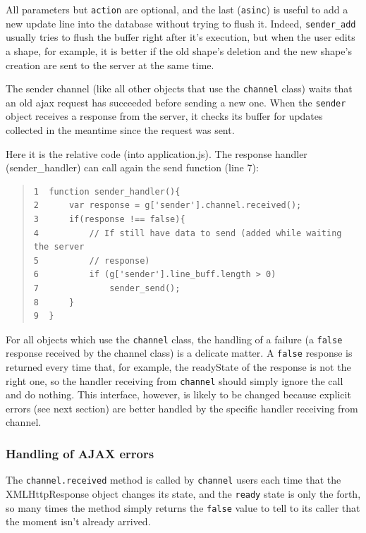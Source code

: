 \documentclass[10pt,a4paper,english]{book}
\begin{document}
All parameters but \texttt{action} are optional, and the last (\texttt{asinc})
is useful to add a new update line into the database without trying to
flush it. Indeed, \texttt{sender{\_}add} usually tries to flush the buffer
right after it's execution, but when the user edits a shape, for
example, it is better if the old shape's deletion and the new shape's
creation are sent to the server at the same time.

The sender channel (like all other objects that use the \texttt{channel}
class) waits that an old ajax request has succeeded before sending a
new one. When the \texttt{sender} object receives a response from the
server, it checks its buffer for updates collected in the meantime
since the request was sent.

Here it is the relative code (into application.js). The response
handler (sender{\_}handler) can call again the send function (line 7):
\begin{quote}\begin{verbatim}
1  function sender_handler(){
2      var response = g['sender'].channel.received();
3      if(response !== false){
4          // If still have data to send (added while waiting the server
5          // response)
6          if (g['sender'].line_buff.length > 0)
7              sender_send();
8      }
9  }
\end{verbatim}
\end{quote}

For all objects which use the \texttt{channel} class, the handling of a
failure (a \texttt{false} response received by the channel class) is a
delicate matter. A \texttt{false} response is returned every time that, for
example, the readyState of the response is not the right one, so the
handler receiving from \texttt{channel} should simply ignore the call and
do nothing. This interface, however, is likely to be changed because
explicit errors (see next section) are better handled by the specific
handler receiving from channel.



\hypertarget{handling-of-ajax-errors}{}
\subsubsection{Handling of AJAX errors}
\label{handling-of-ajax-errors}

The \texttt{channel.received} method is called by \texttt{channel} users each
time that the XMLHttpResponse object changes its state, and the
\texttt{ready} state is only the forth, so many times the method simply
returns the \texttt{false} value to tell to its caller that the moment
isn't already arrived.
\end{document}
